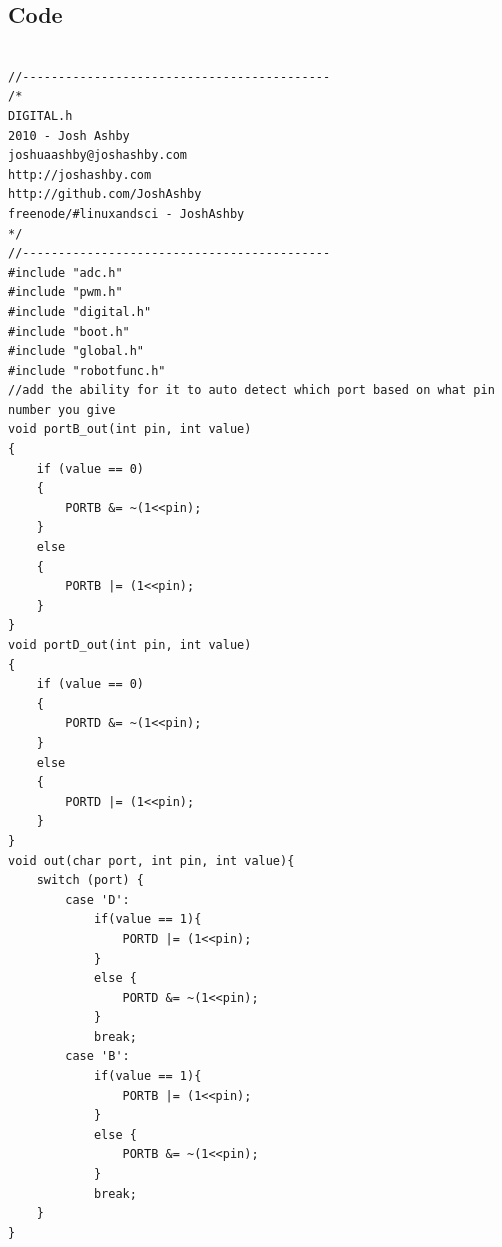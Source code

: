 \documentclass{article}
\begin{document}
\subsection{Code}
\begin{lstlisting}[caption={The digital function library.},label=digital,frame=tbl]

//-------------------------------------------
/*
DIGITAL.h
2010 - Josh Ashby
joshuaashby@joshashby.com
http://joshashby.com
http://github.com/JoshAshby
freenode/#linuxandsci - JoshAshby
*/
//-------------------------------------------
#include "adc.h"
#include "pwm.h"
#include "digital.h"
#include "boot.h"
#include "global.h"
#include "robotfunc.h"
//add the ability for it to auto detect which port based on what pin number you give
void portB_out(int pin, int value)
{
    if (value == 0)
    {
        PORTB &= ~(1<<pin);
    }
    else
    {
        PORTB |= (1<<pin);
    }
}
void portD_out(int pin, int value)
{
    if (value == 0)
    {
        PORTD &= ~(1<<pin);
    }
    else
    {
        PORTD |= (1<<pin);
    }
}
void out(char port, int pin, int value){
    switch (port) {
        case 'D':
            if(value == 1){
                PORTD |= (1<<pin);
            }
            else {
                PORTD &= ~(1<<pin);
            }
            break;
        case 'B':
            if(value == 1){
                PORTB |= (1<<pin);
            }
            else {
                PORTB &= ~(1<<pin);
            }
            break;
    }
}


\end{lstlisting}
\end{document}

